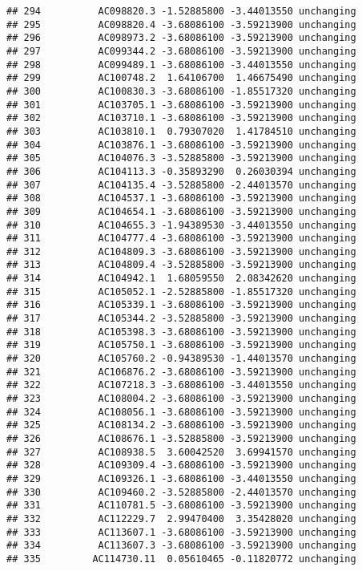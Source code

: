 \documentclass[]{article}
\begin{document}
\begin{verbatim}
## 294          AC098820.3 -1.52885800 -3.44013550 unchanging
## 295          AC098820.4 -3.68086100 -3.59213900 unchanging
## 296          AC098973.2 -3.68086100 -3.59213900 unchanging
## 297          AC099344.2 -3.68086100 -3.59213900 unchanging
## 298          AC099489.1 -3.68086100 -3.44013550 unchanging
## 299          AC100748.2  1.64106700  1.46675490 unchanging
## 300          AC100830.3 -3.68086100 -1.85517320 unchanging
## 301          AC103705.1 -3.68086100 -3.59213900 unchanging
## 302          AC103710.1 -3.68086100 -3.59213900 unchanging
## 303          AC103810.1  0.79307020  1.41784510 unchanging
## 304          AC103876.1 -3.68086100 -3.59213900 unchanging
## 305          AC104076.3 -3.52885800 -3.59213900 unchanging
## 306          AC104113.3 -0.35893290  0.26030394 unchanging
## 307          AC104135.4 -3.52885800 -2.44013570 unchanging
## 308          AC104537.1 -3.68086100 -3.59213900 unchanging
## 309          AC104654.1 -3.68086100 -3.59213900 unchanging
## 310          AC104655.3 -1.94389530 -3.44013550 unchanging
## 311          AC104777.4 -3.68086100 -3.59213900 unchanging
## 312          AC104809.3 -3.68086100 -3.59213900 unchanging
## 313          AC104809.4 -3.52885800 -3.59213900 unchanging
## 314          AC104942.1  1.68059550  2.08342620 unchanging
## 315          AC105052.1 -2.52885800 -1.85517320 unchanging
## 316          AC105339.1 -3.68086100 -3.59213900 unchanging
## 317          AC105344.2 -3.52885800 -3.59213900 unchanging
## 318          AC105398.3 -3.68086100 -3.59213900 unchanging
## 319          AC105750.1 -3.68086100 -3.59213900 unchanging
## 320          AC105760.2 -0.94389530 -1.44013570 unchanging
## 321          AC106876.2 -3.68086100 -3.59213900 unchanging
## 322          AC107218.3 -3.68086100 -3.44013550 unchanging
## 323          AC108004.2 -3.68086100 -3.59213900 unchanging
## 324          AC108056.1 -3.68086100 -3.59213900 unchanging
## 325          AC108134.2 -3.68086100 -3.59213900 unchanging
## 326          AC108676.1 -3.52885800 -3.59213900 unchanging
## 327          AC108938.5  3.60042520  3.69941570 unchanging
## 328          AC109309.4 -3.68086100 -3.59213900 unchanging
## 329          AC109326.1 -3.68086100 -3.44013550 unchanging
## 330          AC109460.2 -3.52885800 -2.44013570 unchanging
## 331          AC110781.5 -3.68086100 -3.59213900 unchanging
## 332          AC112229.7  2.99470400  3.35428020 unchanging
## 333          AC113607.1 -3.68086100 -3.59213900 unchanging
## 334          AC113607.3 -3.68086100 -3.59213900 unchanging
## 335         AC114730.11  0.05610465 -0.11820772 unchanging

\end{verbatim}
\end{document}
